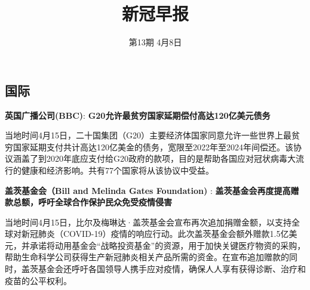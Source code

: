 \documentclass[]{article}
\title{\textcolor{glaucous}{\Huge \textbf {新冠早报}}}
\subtitle{\textcolor{glaucous}{\Large 第13期 \space 4月8日}}
\author{}
\date{\vspace{-2.5em}}
\begin{document}
\maketitle

\fontsize{13}{13}
\selectfont
\vspace{-10truemm}

\newcommand{\resheading}[1]{%
  \noindent\fcolorbox{lavenderblush}{lavenderblush}{\makebox[\dimexpr\textwidth-2\fboxsep-2\fboxrule][l]{\textbf{~#1}}}%
}

\pagestyle{fancyplain}

\renewcommand{\headrulewidth}{0pt}
\setlength{\headheight}{25pt} 
\setlength{\headsep}{-15pt}

%
  \noindent{}%

\hypertarget{section}{%
\subsection{\texorpdfstring{\textcolor{glaucous}{\Large 国际}}{}}\label{section}}

\textbf{\textcolor{glaucous}{英国广播公司(BBC)}}:
\textbf{G20允许最贫穷国家延期偿付高达120亿美元债务 }

当地时间4月15日，二十国集团（G20）主要经济体国家同意允许一些世界上最贫穷国家延期支付共计高达120亿美金的债务，宽限至2022年至2024年间偿还。该协议涵盖了到2020年底应支付给G20政府的款项，目的是帮助各国应对冠状病毒大流行的健康和经济影响。共有77个国家将从该协议中受益。

\textbf{\textcolor{glaucous}{盖茨基金会（Bill and Melinda Gates Foundation)}}
: \textbf{盖茨基金会再度提高赠款总额，呼吁全球合作保护民众免受疫情侵害}

当地时间4月15日，比尔及梅琳达·盖茨基金会宣布再次追加捐赠金额，以支持全球对新冠肺炎（COVID-19）疫情的响应行动。此次盖茨基金会额外赠款1.5亿美元，并承诺将动用基金会``战略投资基金''的资源，用于加快关键医疗物资的采购，帮助生命科学公司获得生产新冠肺炎相关产品所需的资金。在宣布追加赠款的同时，盖茨基金会还呼吁各国领导人携手应对疫情，确保人人享有获得诊断、治疗和疫苗的公平权利。
\end{document}

